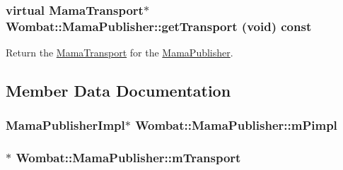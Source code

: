 \label{classWombat_1_1MamaPublisher_acd7d75ae898eb5cc33851ba534c36134}
\hypertarget{classWombat_1_1MamaPublisher_abf6c408f0ccb59c2169ad33f1f557969}{
\subsubsection[{getTransport}]{\setlength{\rightskip}{0pt plus 5cm}virtual {\bf MamaTransport}$\ast$ Wombat::MamaPublisher::getTransport (void) const}}
\label{classWombat_1_1MamaPublisher_abf6c408f0ccb59c2169ad33f1f557969}


Return the \hyperlink{classWombat_1_1MamaTransport}{MamaTransport} for the \hyperlink{classWombat_1_1MamaPublisher}{MamaPublisher}. 

\subsection{Member Data Documentation}
\hypertarget{classWombat_1_1MamaPublisher_a62eebdff64fcd63293122af14757fc5b}{
\subsubsection[{mPimpl}]{\setlength{\rightskip}{0pt plus 5cm}MamaPublisherImpl$\ast$ {\bf Wombat::MamaPublisher::mPimpl}}}
\label{classWombat_1_1MamaPublisher_a62eebdff64fcd63293122af14757fc5b}
\hypertarget{classWombat_1_1MamaPublisher_a1b883709ebf27895ef4b16c25e18ad97}{
\subsubsection[{mTransport}]{$\ast$ {\bf Wombat::MamaPublisher::mTransport}}}
\label{classWombat_1_1MamaPublisher_a1b883709ebf27895ef4b16c25e18ad97}
